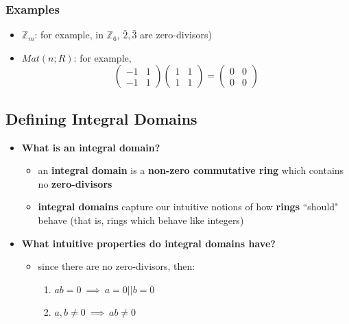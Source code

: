 \documentclass{exam}
\begin{document}
\subsubsection{Examples}

\begin{itemize}
            \item $\mathbb{Z}_m$: for example, in $\mathbb{Z}_6$, $\bar{2}, \bar{3}$ are zero-divisors)
            \item $Mat(n;R)$: for example,
        \[
        \begin{pmatrix}
        -1 & 1 \\
        -1 & 1
        \end{pmatrix}
        \begin{pmatrix}
        1 & 1 \\
        1 & 1
        \end{pmatrix}
        =
        \begin{pmatrix}
        0 & 0 \\
        0 & 0
        \end{pmatrix}
        \]
        \end{itemize}

\subsection{Defining Integral Domains}

\begin{itemize}
    \item \textbf{What is an integral domain?}
    \begin{itemize}
        \item an \textbf{integral domain} is a \textbf{non-zero commutative ring} which contains no \textbf{zero-divisors}
        \item \textbf{integral domains} capture our intuitive notions of how \textbf{rings} ``should" behave (that is, rings which behave like integers)
    \end{itemize}
    \item \textbf{What intuitive properties do integral domains have?}
    \begin{itemize}
        \item since there are no zero-divisors, then:
        \begin{enumerate}
            \item $ab = 0 \ \implies \ a = 0 || b = 0$
            \item $a, b \neq 0 \ \implies \ ab \neq 0$
        \end{enumerate}
    \end{itemize}
\end{itemize}
\end{document}
